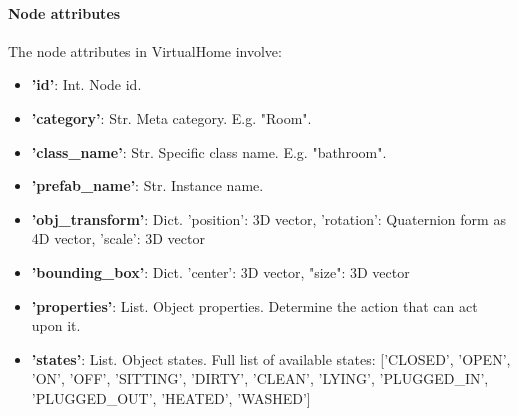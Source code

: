 \paragraph{Node attributes} The node attributes in VirtualHome involve:
\begin{itemize}
    \item \textbf{'id'}: Int. Node id.
    \item \textbf{'category'}: Str. Meta category. E.g. "Room".
    \item \textbf{'class\_name'}: Str. Specific class name. E.g. "bathroom". 
    \item \textbf{'prefab\_name'}: Str. Instance name.
    \item \textbf{'obj\_transform'}: Dict. {'position': 3D vector, 'rotation': Quaternion form as 4D vector, 'scale': 3D vector} 
    \item \textbf{'bounding\_box'}: Dict. {'center': 3D vector, "size": 3D vector} 
    \item \textbf{'properties'}: List. Object properties. Determine the action that can act upon it. 
    \item \textbf{'states'}: List. Object states. Full list of available states: ['CLOSED', 'OPEN', 'ON', 'OFF', 'SITTING', 'DIRTY', 'CLEAN', 'LYING', 'PLUGGED\_IN', 'PLUGGED\_OUT', 'HEATED', 'WASHED']
\end{itemize}

